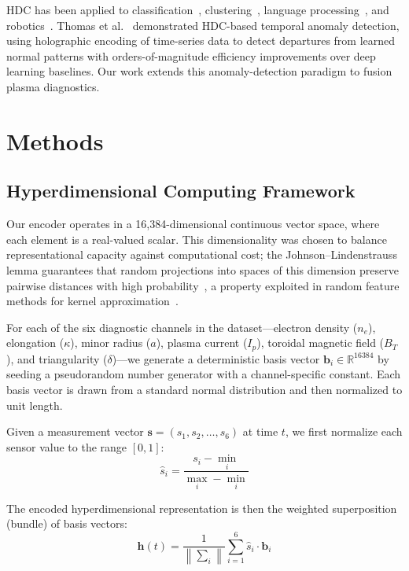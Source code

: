 \documentclass[twocolumn,prl,aps,superscriptaddress,floatfix]{revtex4-2}
\begin{document}
HDC has been applied to classification~\cite{Ge2020}, clustering~\cite{Kim2020}, language processing~\cite{Kanerva2009}, and robotics~\cite{Neubert2019}. Thomas et al.~\cite{Thomas2022} demonstrated HDC-based temporal anomaly detection, using holographic encoding of time-series data to detect departures from learned normal patterns with orders-of-magnitude efficiency improvements over deep learning baselines. Our work extends this anomaly-detection paradigm to fusion plasma diagnostics.

\section{Methods}
\label{sec:methods}

\subsection{Hyperdimensional Computing Framework}

Our encoder operates in a 16,384-dimensional continuous vector space, where each element is a real-valued scalar. This dimensionality was chosen to balance representational capacity against computational cost; the Johnson--Lindenstrauss lemma guarantees that random projections into spaces of this dimension preserve pairwise distances with high probability~\cite{JohnsonLindenstrauss1984}, a property exploited in random feature methods for kernel approximation~\cite{Rahimi2009}.

For each of the six diagnostic channels in the dataset---electron density ($n_e$), elongation ($\kappa$), minor radius ($a$), plasma current ($I_p$), toroidal magnetic field ($B_T$), and triangularity ($\delta$)---we generate a deterministic basis vector $\mathbf{b}_i \in \mathbb{R}^{16384}$ by seeding a pseudorandom number generator with a channel-specific constant. Each basis vector is drawn from a standard normal distribution and then normalized to unit length.

Given a measurement vector $\mathbf{s} = (s_1, s_2, \ldots, s_6)$ at time $t$, we first normalize each sensor value to the range $[0, 1]$:
\begin{equation}
\hat{s}_i = \frac{s_i - \min_i}{\max_i - \min_i}
\label{eq:normalize}
\end{equation}

The encoded hyperdimensional representation is then the weighted superposition (bundle) of basis vectors:
\begin{equation}
\mathbf{h}(t) = \frac{1}{\left\|\sum_i\right\|} \sum_{i=1}^{6} \hat{s}_i \cdot \mathbf{b}_i
\label{eq:encode}
\end{equation}
\end{document}
